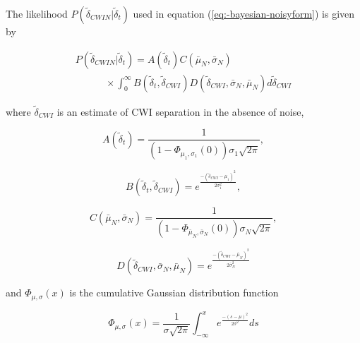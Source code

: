 \documentclass[12pt,double]{article}
\begin{document}
The likelihood $P(\widetilde{\delta}_{CWIN}|\widetilde{\delta}_t)$
used in equation (\ref{eq:-bayesian-noisyform}) is given by
\begin{linenomath*} \begin{equation}
\begin{array}{l}
\label{eq-likelihood-int}
P(\widetilde{\delta}_{CWIN}|\widetilde{\delta}_t)  =
A(\widetilde{\delta}_t) C(\bar{\mu}_N, \bar{\sigma}_N)  \\
\hspace{3em} \times \int_0^\infty
B(\widetilde{\delta}_t,\widetilde{\delta}_{CWI})
D(\widetilde{\delta}_{CWI},\bar{\sigma}_N,\bar{\mu}_N )
d\widetilde{\delta}_{CWI}
\end{array}
\end{equation} \end{linenomath*}
where $\widetilde{\delta}_{CWI}$ is an estimate of CWI separation in the absence
of noise,
\begin{linenomath*} \begin{equation}
\label{eq:Adefn}
A(\widetilde{\delta}_t) = \frac{1}{(1-\Phi_{\mu_1,\sigma_1}(0))\sigma_1\sqrt{2\pi} },
\end{equation} \end{linenomath*}
\begin{linenomath*} \begin{equation}
B(\widetilde{\delta}_t,\widetilde{\delta}_{CWI})=e^{  \frac{-(\widetilde{\delta}_{CWI}-\mu_1)^2}{2\sigma_1^2} },
\end{equation} \end{linenomath*}
\begin{linenomath*} \begin{equation}
\label{eq:Cdefn}
C(\bar{\mu}_N, \bar{\sigma}_N) =  \frac{1}{(1-\Phi_{\bar{\mu}_N,\bar{\sigma}_N}(0))\sigma_N\sqrt{2\pi}},
\end{equation} \end{linenomath*}
\begin{linenomath*} \begin{equation}
D(\widetilde{\delta}_{CWI},\bar{\sigma}_N,\bar{\mu}_N )=e^{  \frac{-(\widetilde{\delta}_{CWI}-\bar{\mu}_N)^2}{2 \bar{\sigma}_N ^2} }
\end{equation} \end{linenomath*}
and $\Phi_{\mu,\sigma}(x)$ is the cumulative Gaussian distribution function
\begin{linenomath*} \begin{equation}
\label{eq-cummulative-Gaussian}
\Phi_{\mu,\sigma}(x) = \frac{1}{\sigma \sqrt{2 \pi}}
\int_{-\infty}^x e^{  \frac{-(s-\mu)^2}{2\sigma^2}  } ds
\end{equation} \end{linenomath*}
\end{document}
